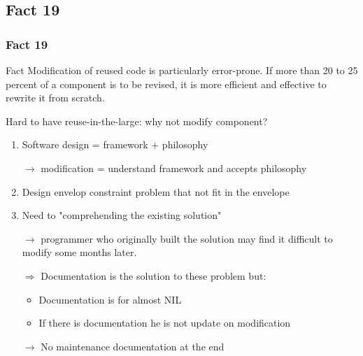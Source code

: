 \documentclass{beamer}
\begin{document}
\subsection{Fact 19}
\begin{frame}
    \frametitle{Fact 19}
    \begin{block}{Fact}
    Modification of reused code is particularly error-prone. If more than 20 to
    25 percent of a component is to be revised, it is more efficient and
    effective to rewrite it from scratch.
    \end{block}

    Hard to have reuse-in-the-large: why not modify component?

    \begin{enumerate}
        \item Software design = framework + philosophy

            $\rightarrow$ modification = understand
            framework and accepts philosophy

        \item Design envelop constraint problem that not fit in the
            envelope

        \item Need to "comprehending the existing solution"

            $\rightarrow$ programmer who originally built the solution
            may find it difficult to modify some months later.

        \item[$\Rightarrow$] Documentation is the solution to these
            problem but:
            \begin{itemize}
                    \item Documentation is for almost NIL
                    \item If there is documentation he is not update on
                        modification
            \end{itemize}

            $\rightarrow$ No maintenance documentation at the end
    \end{enumerate}

\end{frame}
\end{document}
